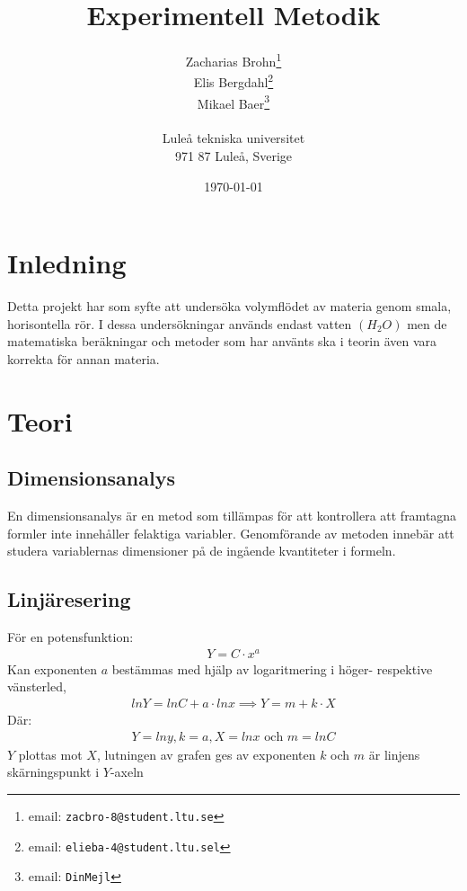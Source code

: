 \documentclass[a4paper,12pt]{article}
\title{Experimentell Metodik}
\author{Zacharias Brohn\thanks{email: \texttt{zacbro-8@student.ltu.se}}\\  
        Elis Bergdahl\thanks{email: \texttt{elieba-4@student.ltu.sel}} \\
        Mikael Baer\thanks{email: \texttt{DinMejl}} \\
        ~ \\
        Luleå tekniska universitet \\ 
        971 87 Luleå, Sverige}
\date{\today}
\begin{document}
%
\maketitle
%
\begin{abstract}
\end{abstract}
%
\section{Inledning}
    Detta projekt har som syfte att undersöka volymflödet av materia genom smala, horisontella rör. I dessa undersökningar används endast vatten $(H_2O)$ men de matematiska beräkningar och metoder som har använts ska i teorin även vara korrekta för annan materia.
%
\section{Teori}
%
\subsection{Dimensionsanalys}
    En dimensionsanalys är en metod som tillämpas för att kontrollera att framtagna formler inte innehåller felaktiga variabler. Genomförande av metoden innebär att studera variablernas dimensioner på de ingående kvantiteter i formeln.
%
\subsection{Linjäresering}
    För en potensfunktion:
        \begin{align}
            Y = C \cdot x^a
        \end{align}
    Kan exponenten $a$ bestämmas med hjälp av logaritmering i höger- respektive vänsterled,
        \begin{align}
            ln Y = ln C + a \cdot ln x \implies Y = m + k \cdot X
        \end{align}
    Där:
        \begin{align}
            Y = ln y, k = a, X = ln x \text{ och } m = ln C
        \end{align}
    $Y$ plottas mot $X$, lutningen av grafen ges av exponenten $k$ och $m$ är linjens skärningspunkt i $Y$-axeln
%
\end{document}
